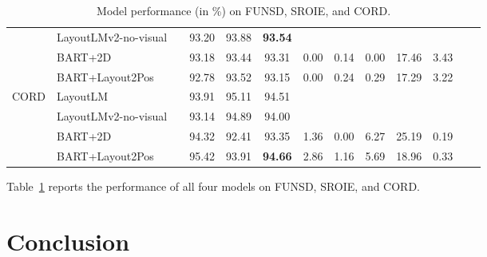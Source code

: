 \begin{table}
\begin{adjustbox}{max width=\textwidth}
\begin{threeparttable}
\begin{tabular}{llccccccccccc}
      & LayoutLMv2-no-visual             &  & 93.20 &	93.88 &	\textbf{93.54} & \cellcolor[gray]{0.9} & \cellcolor[gray]{0.9} & \cellcolor[gray]{0.9} & \cellcolor[gray]{0.9} &  \cellcolor[gray]{0.9} \\
      & BART+2D & & 93.18 &	93.44 &	93.31 &	0.00 & 	0.14 &	0.00 &	17.46 &	3.43 \\
      & BART+Layout2Pos & & 92.78 &	93.52 &	93.15 & 0.00 &	0.24 &	0.29 &	17.29 & 3.22 \\
      \midrule
      \multirow{4}{*}{CORD} & LayoutLM  \citep{xu2020layoutlm} & & 93.91 & 95.11 & 94.51 & \cellcolor[gray]{0.9} & \cellcolor[gray]{0.9} & \cellcolor[gray]{0.9} & \cellcolor[gray]{0.9} & \cellcolor[gray]{0.9}  \\ 
      & LayoutLMv2-no-visual             & & 93.14 &	94.89 &	94.00 & \cellcolor[gray]{0.9} & \cellcolor[gray]{0.9} & \cellcolor[gray]{0.9} & \cellcolor[gray]{0.9} &  \cellcolor[gray]{0.9} \\  
      & BART+2D & & 94.32 & 92.41 &	93.35 & 1.36 & 0.00 &	6.27 &	25.19 & 0.19 \\
      & BART+Layout2Pos & & 95.42 &	93.91 &	\textbf{94.66} & 2.86 & 1.16 & 5.69 &	18.96 &	0.33 \\
      \bottomrule
  \end{tabular}
  \end{threeparttable}
  \end{adjustbox}
  \caption{Model performance (in \%) on FUNSD, SROIE, and CORD.}
  \label{table:visual-information-extraction-results}
\end{table}


Table~\ref{table:visual-information-extraction-results} reports the performance of all four models on FUNSD, SROIE, and CORD.


\section{Conclusion}